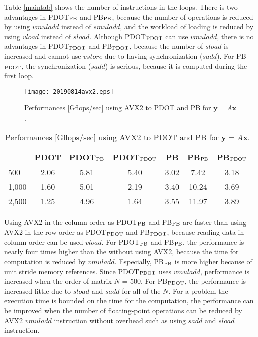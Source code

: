 \documentclass{IOS-Book-Article}
\begin{document}
Table \ref{maintab} shows the number of instructions in the loops.
There is two advantages in PDOT$_{\rm{PB}}$ and PB$_{\rm{PB}}$, because the number of operations is reduced by using $vmuladd$ instead of $smuladd$, and the workload of loading is reduced by using $vload$ instead of $sload$. Although PDOT$_{\rm{PDOT}}$ can use $vmuladd$, there is no advantages in PDOT$_{\rm{PDOT}}$ and PB$_{\rm{PDOT}}$, because the number of $sload$ is increased and cannot use $vstore$ due to having synchronization ($sadd$). For PB$_{\rm{PDOT}}$, the synchronization ($sadd$) is serious, because it is computed during the first loop.

\begin{figure}[htbp]
  \begin{center}
    \texttt{[image: 20190814avx2.eps]}
    \caption{Performances [Gflops/sec] using AVX2 to PDOT and PB for $\bm{y} = A\bm{x}$.}
    \label{figMV}
  \end{center}
\end{figure}

\begin{table}[htbp]
\centering
\footnotesize
\caption{Performances [Gflops/sec] using AVX2 to PDOT and PB for $\bm{y} = A\bm{x}$. }
\label{MVavx}
\begin{tabular}{l||c|cc||c|cc}
\hline
                       & PDOT    & PDOT$_{\rm{PB}}$       & PDOT$_{\rm{PDOT}}$      & PB   & PB$_{\rm{PB}}$        & PB$_{\rm{PDOT}}$       \\ \hline
\multirow{1}{*}{500}   & 2.06  & 5.81  & 5.40 & 3.02 & 7.42  & 3.18 \\  
\multirow{1}{*}{1,000} & 1.60  & 5.01  & 2.19 & 3.40 & 10.24 & 3.69 \\
\multirow{1}{*}{2,500} & 1.25  & 4.96  & 1.64 & 3.55 & 11.97 & 3.89 \\ \hline
\end{tabular}
\end{table}

Using AVX2 in the column order as PDOT$_{\rm{PB}}$ and PB$_{\rm{PB}}$ are faster than using AVX2 in the row order as PDOT$_{\rm{PDOT}}$ and PB$_{\rm{PDOT}}$, because reading data in column order can be used $vload$.
For PDOT$_{\rm{PB}}$ and PB$_{\rm{PB}}$, the performance is nearly four times higher than the without using AVX2, because the time for computation is reduced by $vmuladd$. Especially, PB$_{\rm{PB}}$ is more higher because of unit stride memory references. Since PDOT$_{\rm{PDOT}}$ uses $vmuladd$, performance is increased when the order of matrix $N$ = 500. For PB$_{\rm{PDOT}}$, the performance is increased little due to $sload$ and $sadd$ for all of the $N$.
For a problem the execution time is bounded on the time for the computation, the performance can be improved when the number of floating-point operations can be reduced by AVX2 $vmuladd$ instruction without overhead such as using $sadd$ and $sload$ instruction.
\end{document}

